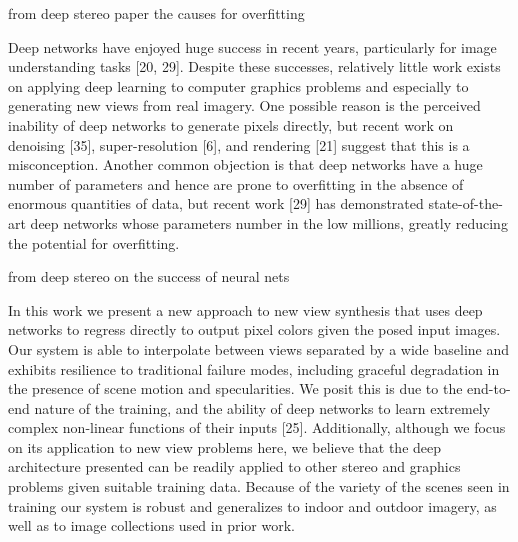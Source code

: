 


from deep stereo paper the causes for overfitting

Deep networks have enjoyed huge success in recent
years, particularly for image understanding tasks [20, 29].
Despite these successes, relatively little work exists on applying
deep learning to computer graphics problems and especially
to generating new views from real imagery. One
possible reason is the perceived inability of deep networks
to generate pixels directly, but recent work on denoising
[35], super-resolution [6], and rendering [21] suggest
that this is a misconception. Another common objection is
that deep networks have a huge number of parameters and
hence are prone to overfitting in the absence of enormous
quantities of data, but recent work [29] has demonstrated
state-of-the-art deep networks whose parameters number in
the low millions, greatly reducing the potential for overfitting.

from deep stereo on the success of neural nets

In this work we present a new approach to new view synthesis
that uses deep networks to regress directly to output
pixel colors given the posed input images. Our system
is able to interpolate between views separated by a
wide baseline and exhibits resilience to traditional failure
modes, including graceful degradation in the presence of
scene motion and specularities. We posit this is due to the
end-to-end nature of the training, and the ability of deep
networks to learn extremely complex non-linear functions
of their inputs [25].
Additionally, although we focus on its application
to new view problems here, we believe that the
deep architecture presented can be readily applied to other
stereo and graphics problems given suitable training data.
Because
of the variety of the scenes seen in training our system is robust
and generalizes to indoor and outdoor imagery, as well
as to image collections used in prior work.